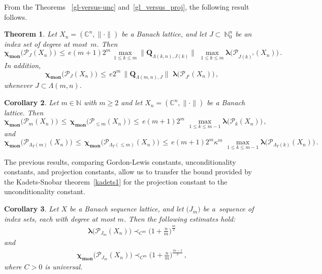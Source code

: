 \documentclass[12pt]{amsart}
\numberwithin{subsection}{section}
\newtheorem{theorem}{Theorem}[section]
\newtheorem{corollary}[theorem]{Corollary}
\theoremstyle{definition}
\theoremstyle{remark}
\DeclareMathOperator{\mon}{mon}
\newcommand{\chimon}{\chi_{\mon}}
\newcommand{\Pp}{\mathcal{P}}
\begin{document}
From the Theorems ~\ref{gl-versus-unc} and~\ref{gl_versus_proj}, the following result follows.


\begin{theorem}\label{thm: uncond cte vs proj cte}
Let $X_n = (\mathbb{C}^n,\|\cdot\|)$  be a Banach  lattice, and let $J\subset~\mathbb{N}_0^n$ be an index set of degree at most~$m$. Then
\[
\boldsymbol{\chimon}\big( \mathcal{P}_{J}(X_n)\big)
\,\le \,e (m+1) 2^m \,\max_{1 \leq  k \leq m}\|\mathbf{Q}_{\Lambda(k,n),J(k)}\|\,\,
\max_{1 \leq  k \leq m} \boldsymbol{\lambda}\big( \mathcal{P}_{J(k)^\flat}(X_n)\big)\,.
\]
In addition,
\[
\boldsymbol{\chimon}\big( \mathcal{P}_{J}(X_n)\big) \,\le \,e 2^m \, \|\mathbf{Q}_{\Lambda(m,n),J}\|
\,\, \boldsymbol{\lambda}\big( \mathcal{P}_{J^\flat}(X_n)\big)\,,
\]
whenever  $J \subset \Lambda(m,n)$.
\end{theorem}


\begin{corollary} \label{main3A}
Let $m \in \mathbb{N}$ with $m\geq 2$ and let $X_n = (\mathbb{C}^n,\|\cdot\|)$  be a Banach  lattice. Then
\[
\boldsymbol{\chimon}\big( \mathcal{P}_{m}(X_n)\big) \,\le \, \boldsymbol{\chimon}\big( \mathcal{P}_{\leq m}(X_n)\big)
\,\le \,e (m+1) 2^m  \,\,\max_{1 \leq  k \leq m-1} \boldsymbol{\lambda}\big( \mathcal{P}_{k}(X_n)\big)\,,
\]
and
\[
\boldsymbol{\chimon}\big( \Pp_{\Lambda_T(m)}(X_n)\big) \,\le \,\boldsymbol{\chimon}\big(\Pp_{\Lambda_T(\le m)}(X_n)\big)
 \,\le \,e (m+1) 2^m \kappa^m  \,\,\max_{1 \leq  k \leq m-1} \boldsymbol{\lambda}\big( \Pp_{\Lambda_T(k)}(X_n)\big)\,.
\]
\end{corollary}


The previous results, comparing Gordon-Lewis constants, unconditionality constants, and projection constants, allow us to
transfer the bound provided by the Kadets-Snobar theorem~\eqref{kadets1} for the projection constant to the unconditionality
constant.


\begin{corollary}\label{K-S for poly}
Let  $X$ be a Banach sequence lattice, and let $\big(J_m\big)$ be a~sequence of index sets, each with degree at most $m$.
Then the following estimates hold{\rm:}
\begin{align} \label{mmm}
\boldsymbol{\lambda}\big(\mathcal{P}_{J_m}(X_n)\big)  \prec_{C^m}\Big(1+\frac{n}{m}\Big)^{\frac{m}{2}}
\end{align}
and
\begin{align*}
\boldsymbol{\chimon}\big(\mathcal{P}_{J_m}(X_n)\big)  \prec_{C^m}\Big(1+ \frac{n}{m}\Big)^{\frac{m-1}{2}}\,,
\end{align*}
where $C > 0$ is universal.
\end{corollary}
\end{document}
